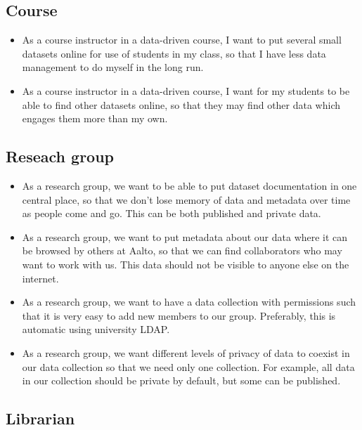 \subsection{Course}

\begin{itemize}
    \item As a course instructor in a data-driven course, I want to put several
          small datasets online for use of students in my class, so that I have
          less data management to do myself in the long run.

        \item As a course instructor in a data-driven course, I want for my students
              to be able to find other datasets online, so that they may find other
              data which engages them more than my own.
\end{itemize}

\subsection{Reseach group}

\begin{itemize}
    \item As a research group, we want to be able to put dataset documentation
          in one central place, so that we don't lose memory of data and
          metadata over time as people come and go.  This can be both published
          and private data.
    \item As a research group, we want to put metadata about our data where it
          can be browsed by others at Aalto, so that we can find collaborators
          who may want to work with us.  This data should not be visible to
          anyone else on the internet.
    \item As a research group, we want to have a data collection with
          permissions such that it is very easy to add new members to our
          group. Preferably, this is automatic using university LDAP.
    \item As a research group, we want different levels of privacy of data to
          coexist in our data collection so that we need only one collection.
          For example, all data in our collection should be private by default,
          but some can be published.
\end{itemize}

\subsection{Librarian}

